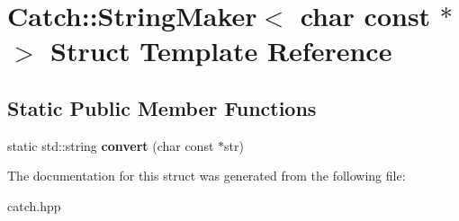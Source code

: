 \hypertarget{structCatch_1_1StringMaker_3_01char_01const_01_5_01_4}{}\section{Catch\+::String\+Maker$<$ char const $\ast$ $>$ Struct Template Reference}
\label{structCatch_1_1StringMaker_3_01char_01const_01_5_01_4}
\subsection*{Static Public Member Functions}
\begin{DoxyCompactItemize}
\item 
\mbox{\label{structCatch_1_1StringMaker_3_01char_01const_01_5_01_4_a20813965ad59cdf6d1f874f47158432d}} 
static std\+::string {\bfseries convert} (char const $\ast$str)
\end{DoxyCompactItemize}


The documentation for this struct was generated from the following file\+:\begin{DoxyCompactItemize}
\item 
catch.\+hpp\end{DoxyCompactItemize}
